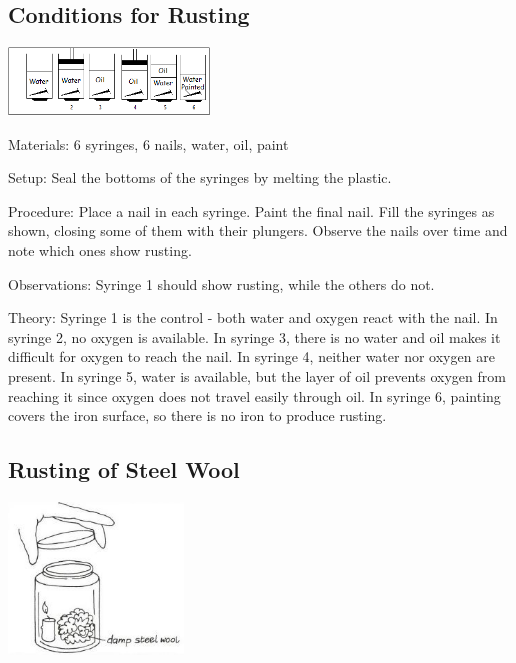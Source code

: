\begin{multicols}{2}
\subsection{Conditions for Rusting}

\begin{center}
\includegraphics[width=0.4\textwidth]{./img/rusting-nails-6.png}
\end{center}

\begin{description*}
\item[Materials:]{6 syringes, 6 nails, water, oil, paint}
\item[Setup:]{Seal the bottoms of the syringes by melting the plastic.}
\item[Procedure:]{Place a nail in each syringe. Paint the final nail. Fill the syringes as shown, closing some of them with their plungers. Observe the nails over time and note which ones show rusting.}
\item[Observations:]{Syringe 1 should show rusting, while the others do not.}
\item[Theory:]{Syringe 1 is the control - both water and oxygen react with the nail. In syringe 2, no oxygen is available. In syringe 3, there is no water and oil makes it difficult for oxygen to reach the nail. In syringe 4, neither water nor oxygen are present. In syringe 5, water is available, but the layer of oil prevents oxygen from reaching it since oxygen does not travel easily through oil. In syringe 6, painting covers the iron surface, so there is no iron to produce rusting.}
\end{description*}

\subsection{Rusting of Steel Wool} %

\begin{center}
\includegraphics[width=0.35\textwidth]{./img/vso/rusting-steel-wool.jpg}
\end{center}


\end{multicols}
